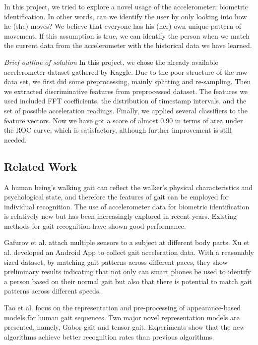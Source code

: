 \documentclass{article} %
\begin{document}
In this project, we tried to explore a novel usage of the accelerometer: biometric identification. In other words, can we identify the user by only looking into how he (she) moves? We believe that everyone has his (her) own unique pattern of movement. If this assumption is true, we can identify the person when we match the current data from the accelerometer with the historical data we have learned.

\emph{Brief outline of solution} In this project, we chose the already available accelerometer dataset gathered by Kaggle. Due to the poor structure of the raw data set, we first did some preprocessing, mainly splitting and re-sampling. Then we extracted discriminative features from preprocessed dataset. The features we used included FFT coefficients, the distribution of timestamp intervals, and the set of possible acceleration readings. Finally, we applied several classifiers to the feature vectors. Now we have got a score of almost 0.90 in terms of area under the ROC curve, which is satisfactory, although further improvement is still needed.






\subsection{Related Work} 

A human being's walking gait can reflect the walker's physical characteristics and psychological state, and therefore the features of gait can be employed for individual recognition. The use of accelerometer data for biometric identification is relatively new but has been increasingly explored in recent years. Existing methods for gait recognition have shown good performance.
 
Gafurov et al. \cite{Gafurov:AIAT2007} attach multiple sensors to a subject at different body parts. Xu et al. \cite{Xu:ICB2012} developed an Android App to collect gait acceleration data. With a reasonably sized dataset, by matching gait patterns across different paces, they show preliminary results indicating that not only can smart phones be used to identify a person based on their normal gait but also that there is potential to match gait patterns across different speeds.

Tao et al.\cite{Tao:ToPAMI2007} focus on the representation and pre-processing of appearance-based models for human gait sequences. Two major novel representation models are presented, namely, Gabor gait and tensor gait. Experiments show that the new algorithms achieve better recognition rates than previous algorithms.
\end{document}
